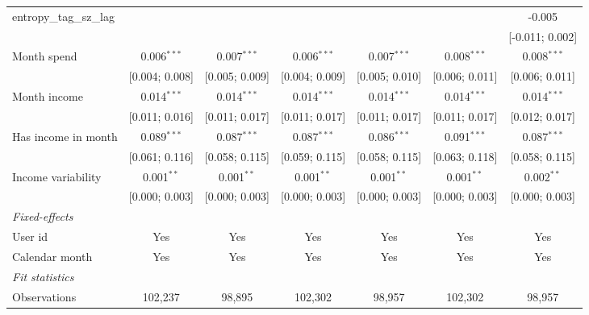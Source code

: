 \begin{table}[htbp]
\begin{threeparttable}[b]
\begin{tabular}{lcccccc}
         entropy\_tag\_sz\_lag            &                  &                  &                  &                  &                  & -0.005\\   
                                          &                  &                  &                  &                  &                  & [-0.011; 0.002]\\   
         Month spend                      & 0.006$^{***}$    & 0.007$^{***}$    & 0.006$^{***}$    & 0.007$^{***}$    & 0.008$^{***}$    & 0.008$^{***}$\\   
                                          & [0.004; 0.008]   & [0.005; 0.009]   & [0.004; 0.009]   & [0.005; 0.010]   & [0.006; 0.011]   & [0.006; 0.011]\\   
         Month income                     & 0.014$^{***}$    & 0.014$^{***}$    & 0.014$^{***}$    & 0.014$^{***}$    & 0.014$^{***}$    & 0.014$^{***}$\\   
                                          & [0.011; 0.016]   & [0.011; 0.017]   & [0.011; 0.017]   & [0.011; 0.017]   & [0.011; 0.017]   & [0.012; 0.017]\\   
         Has income in month              & 0.089$^{***}$    & 0.087$^{***}$    & 0.087$^{***}$    & 0.086$^{***}$    & 0.091$^{***}$    & 0.087$^{***}$\\   
                                          & [0.061; 0.116]   & [0.058; 0.115]   & [0.059; 0.115]   & [0.058; 0.115]   & [0.063; 0.118]   & [0.058; 0.115]\\   
         Income variability               & 0.001$^{**}$     & 0.001$^{**}$     & 0.001$^{**}$     & 0.001$^{**}$     & 0.001$^{**}$     & 0.002$^{**}$\\   
                                          & [0.000; 0.003]   & [0.000; 0.003]   & [0.000; 0.003]   & [0.000; 0.003]   & [0.000; 0.003]   & [0.000; 0.003]\\   
         \midrule
         \emph{Fixed-effects}\\
         User id                          & Yes              & Yes              & Yes              & Yes              & Yes              & Yes\\  
         Calendar month                   & Yes              & Yes              & Yes              & Yes              & Yes              & Yes\\  
         \midrule
         \emph{Fit statistics}\\
         Observations                     & 102,237          & 98,895           & 102,302          & 98,957           & 102,302          & 98,957\\  

\end{tabular}
\end{threeparttable}
\end{table}
